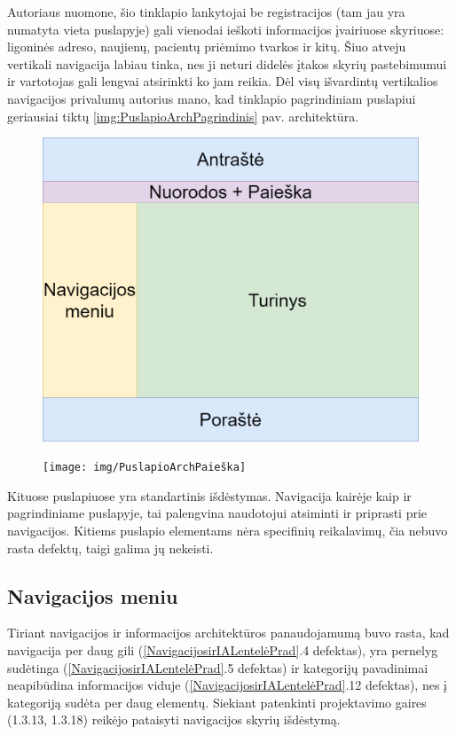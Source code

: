 \documentclass{VUMIFPSbakalaurinis}
\begin{document}
Autoriaus nuomone, šio tinklapio lankytojai be registracijos (tam jau yra numatyta vieta puslapyje) gali vienodai ieškoti informacijos įvairiuose skyriuose: ligoninės adreso, naujienų, pacientų priėmimo tvarkos ir kitų. Šiuo atveju vertikali navigacija labiau tinka, nes ji neturi didelės įtakos skyrių pastebimumui ir vartotojas gali lengvai atsirinkti ko jam reikia. Dėl visų išvardintų vertikalios navigacijos privalumų autorius mano, kad tinklapio pagrindiniam puslapiui geriausiai tiktų \ref{img:PuslapioArchPagrindinis} pav. architektūra.

\begin{figure}[htb]
\centering
\begin{minipage}{.5\textwidth}
  \centering
  \includegraphics[width=0.9\linewidth]{img/PuslapioArchTurinys}
  \label{img:TurinysArch}
\end{minipage}%
\begin{minipage}{.5\textwidth}
  \centering
  \texttt{[image: img/PuslapioArchPaieška]}
  \label{img:PaieškaArch}
\end{minipage}
\end{figure}

Kituose puslapiuose yra standartinis išdėstymas. Navigacija kairėje kaip ir pagrindiniame puslapyje, tai palengvina naudotojui atsiminti ir priprasti prie navigacijos. Kitiems puslapio elementams nėra specifinių reikalavimų, čia nebuvo rasta defektų, taigi galima jų nekeisti.

\pagebreak
\subsection{Navigacijos meniu}
Tiriant navigacijos ir informacijos architektūros panaudojamumą buvo rasta, kad navigacija per daug gili (\ref{NavigacijosirIALentelėPrad}.4 defektas), yra pernelyg sudėtinga (\ref{NavigacijosirIALentelėPrad}.5 defektas) ir kategorijų pavadinimai neapibūdina informacijos viduje (\ref{NavigacijosirIALentelėPrad}.12 defektas), nes į kategoriją sudėta per daug elementų. Siekiant patenkinti projektavimo gaires (1.3.13, 1.3.18) reikėjo pataisyti navigacijos skyrių išdėstymą.
\end{document}
